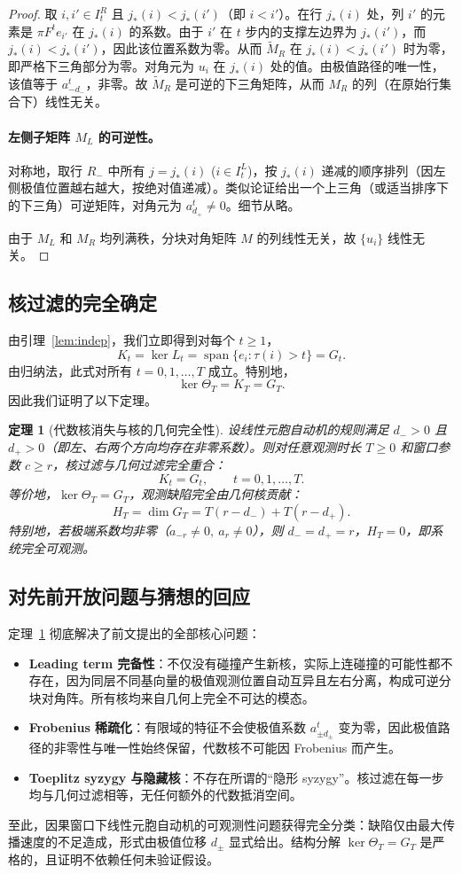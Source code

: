 \documentclass[11pt,a4paper]{ctexart}
\newtheorem{theorem}{定理}[section]
\DeclareMathOperator{\spanop}{span}
\begin{document}
\begin{proof}
取 \(i,i'\in I_t^R\) 且 \(j_*(i)<j_*(i')\)（即 \(i<i'\)）。在行 \(j_*(i)\) 处，列 \(i'\) 的元素是 \(\pi F^t e_{i'}\) 在 \(j_*(i)\) 的系数。由于 \(i'\) 在 \(t\) 步内的支撑左边界为 \(j_*(i')\)，而 \(j_*(i)<j_*(i')\)，因此该位置系数为零。从而 \(\tilde M_R\) 在 \(j_*(i)<j_*(i')\) 时为零，即严格下三角部分为零。对角元为 \(u_i\) 在 \(j_*(i)\) 处的值。由极值路径的唯一性，该值等于 \(a_{-d_-}^t\)，非零。故 \(\tilde M_R\) 是可逆的下三角矩阵，从而 \(M_R\) 的列（在原始行集合下）线性无关。

\paragraph{左侧子矩阵 \(M_L\) 的可逆性。}
对称地，取行 \(R_-\) 中所有 \(j=j_*(i)\) (\(i\in I_t^L\))，按 \(j_*(i)\) 递减的顺序排列（因左侧极值位置越右越大，按绝对值递减）。类似论证给出一个上三角（或适当排序下的下三角）可逆矩阵，对角元为 \(a_{d_+}^t\neq 0\)。细节从略。

由于 \(M_L\) 和 \(M_R\) 均列满秩，分块对角矩阵 \(M\) 的列线性无关，故 \(\{u_i\}\) 线性无关。
\end{proof}

\subsection{核过滤的完全确定}
由引理~\ref{lem:indep}，我们立即得到对每个 \(t\ge 1\)，
\[
  K_t = \ker L_t = \spanop\{e_i:\tau(i)>t\} = G_t.
\]
由归纳法，此式对所有 \(t=0,1,\dots,T\) 成立。特别地，
\[
  \ker\Theta_T = K_T = G_T.
\]
因此我们证明了以下定理。

\begin{theorem}[代数核消失与核的几何完全性]\label{thm:final}
设线性元胞自动机的规则满足 \(d_->0\) 且 \(d_+>0\)（即左、右两个方向均存在非零系数）。则对任意观测时长 \(T\ge 0\) 和窗口参数 \(c\ge r\)，核过滤与几何过滤完全重合：
\[
  K_t = G_t,\qquad t=0,1,\dots,T.
\]
等价地，\(\ker\Theta_T = G_T\)，观测缺陷完全由几何核贡献：
\[
  H_T = \dim G_T = T(r-d_-) + T(r-d_+).
\]
特别地，若极端系数均非零（\(a_{-r}\neq0,\ a_r\neq0\)），则 \(d_-=d_+=r\)，\(H_T=0\)，即系统完全可观测。
\end{theorem}

\subsection{对先前开放问题与猜想的回应}
定理~\ref{thm:final} 彻底解决了前文提出的全部核心问题：
\begin{itemize}
  \item \textbf{Leading term 完备性}：不仅没有碰撞产生新核，实际上连碰撞的可能性都不存在，因为同层不同基向量的极值观测位置自动互异且左右分离，构成可逆分块对角阵。所有核均来自几何上完全不可达的模态。
  \item \textbf{Frobenius 稀疏化}：有限域的特征不会使极值系数 \(a_{\pm d_\pm}^t\) 变为零，因此极值路径的非零性与唯一性始终保留，代数核不可能因 Frobenius 而产生。
  \item \textbf{Toeplitz syzygy 与隐藏核}：不存在所谓的“隐形 syzygy”。核过滤在每一步均与几何过滤相等，无任何额外的代数抵消空间。
\end{itemize}

至此，因果窗口下线性元胞自动机的可观测性问题获得完全分类：缺陷仅由最大传播速度的不足造成，形式由极值位移 \(d_\pm\) 显式给出。结构分解 \(\ker\Theta_T = G_T\) 是严格的，且证明不依赖任何未验证假设。
\end{document}
